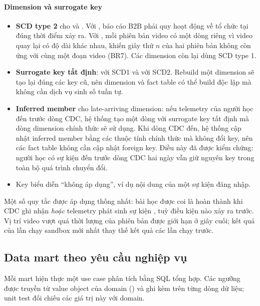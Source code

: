 \paragraph{Dimension và surrogate key}

\begin{itemize}
  \item \textbf{SCD type 2} cho  và . Với , báo cáo B2B phải quy hoạt động về tổ chức tại đúng thời điểm xảy ra. Với , mỗi phiên bản video có một dòng riêng vì video quay lại có độ dài khác nhau, khiến giây thứ $n$ của hai phiên bản không còn ứng với cùng một đoạn video (BR7). Các dimension còn lại dùng SCD type 1.
  \item \textbf{Surrogate key tất định}:  với SCD1 và  với SCD2. Rebuild một dimension sẽ tạo lại đúng các key cũ, nên dimension và fact table có thể build độc lập mà không cần dịch vụ sinh số tuần tự.
  \item \textbf{Inferred member} cho late-arriving dimension: nếu telemetry của người học đến trước dòng CDC, hệ thống tạo một dòng  với surrogate key tất định mà dòng dimension chính thức sẽ sử dụng. Khi dòng CDC đến, hệ thống cập nhật inferred member bằng các thuộc tính chính thức mà không đổi key, nên các fact table không cần cập nhật foreign key. Điều này đã được kiểm chứng: người học  có sự kiện đến trước dòng CDC hai ngày vẫn giữ nguyên key trong toàn bộ quá trình chuyển đổi.
  \item Key  biểu diễn ``không áp dụng'', ví dụ nội dung của một sự kiện đăng nhập.
\end{itemize}

Một số quy tắc được áp dụng thống nhất: bài học được coi là hoàn thành khi CDC ghi nhận  \emph{hoặc} telemetry phát sinh sự kiện , tuỳ điều kiện nào xảy ra trước. Vị trí video vượt quá thời lượng của phiên bản được giới hạn ở giây cuối; kết quả của lần chạy sandbox mới nhất thay thế kết quả các lần chạy trước.

\subsection{Data mart theo yêu cầu nghiệp vụ}

Mỗi mart hiện thực một use case phân tích bằng SQL tổng hợp. Các ngưỡng được truyền từ value object của domain () và ghi kèm trên từng dòng dữ liệu; unit test đối chiếu các giá trị này với domain.

